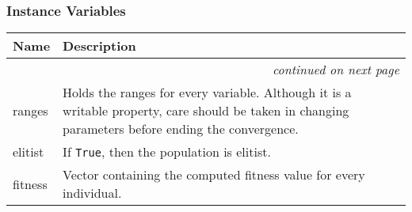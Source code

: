 
  \subsubsection{Instance Variables}

\begin{longtable}{|p{}|p{}|l}
\cline{1-2}
\cline{1-2} \centering \textbf{Name} & \centering \textbf{Description}& \\
\cline{1-2}
\endhead\cline{1-2}\multicolumn{3}{r}{\small\textit{continued on next page}}\\\endfoot\cline{1-2}
\endlastfoot\raggedright r\-a\-n\-g\-e\-s\- & Holds the ranges for every variable. Although it is a writable
property, care should be taken in changing parameters before ending
the convergence.&\\
\cline{1-2}
\raggedright e\-l\-i\-t\-i\-s\-t\- & If \texttt{True}, then the population is elitist.&\\
\cline{1-2}
\raggedright f\-i\-t\-n\-e\-s\-s\- & Vector containing the computed fitness value for every individual.&\\
\cline{1-2}
\end{longtable}

